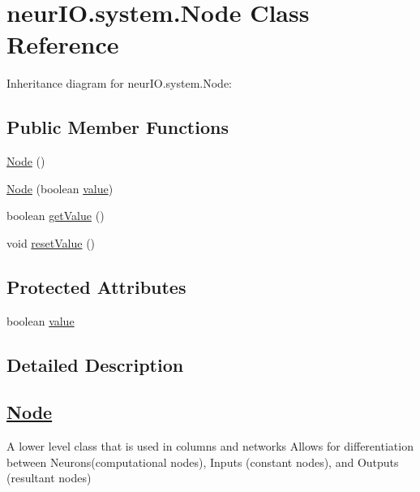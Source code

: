 \hypertarget{classneur_i_o_1_1system_1_1_node}{}\section{neur\+I\+O.\+system.\+Node Class Reference}
\label{classneur_i_o_1_1system_1_1_node}


Inheritance diagram for neur\+I\+O.\+system.\+Node\+:
\subsection*{Public Member Functions}
\begin{DoxyCompactItemize}
\item 
\hyperlink{classneur_i_o_1_1system_1_1_node_a18dfd9e4acbf3ffbbd81870d2740254b}{Node} ()
\item 
\hyperlink{classneur_i_o_1_1system_1_1_node_a82de053582ee57d0ed239293a5b260ba}{Node} (boolean \hyperlink{classneur_i_o_1_1system_1_1_node_a2c6a229d3d2cbf1b313d8797b70e487a}{value})
\item 
boolean \hyperlink{classneur_i_o_1_1system_1_1_node_abcfb650e20f0e7b94dcdbcee0a92852c}{get\+Value} ()
\item 
void \hyperlink{classneur_i_o_1_1system_1_1_node_afd4bea06756a10a4dc05dc06afdcd459}{reset\+Value} ()
\end{DoxyCompactItemize}
\subsection*{Protected Attributes}
\begin{DoxyCompactItemize}
\item 
boolean \hyperlink{classneur_i_o_1_1system_1_1_node_a2c6a229d3d2cbf1b313d8797b70e487a}{value}
\end{DoxyCompactItemize}


\subsection{Detailed Description}
\subsection*{\hyperlink{classneur_i_o_1_1system_1_1_node}{Node} }

A lower level class that is used in columns and networks Allows for differentiation between Neurons(computational nodes), Inputs (constant nodes), and Outputs (resultant nodes) 

